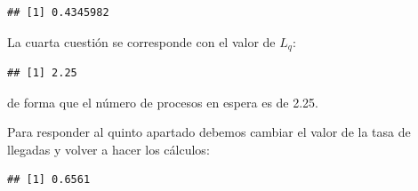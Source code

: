\documentclass[
]{book}
\newenvironment{Shaded}{\begin{snugshade}}{\end{snugshade}}
\newcommand{\AttributeTok}[1]{\textcolor[rgb]{0.77,0.63,0.00}{#1}}
\newcommand{\CommentTok}[1]{\textcolor[rgb]{0.56,0.35,0.01}{\textit{#1}}}
\newcommand{\DecValTok}[1]{\textcolor[rgb]{0.00,0.00,0.81}{#1}}
\newcommand{\FunctionTok}[1]{\textcolor[rgb]{0.00,0.00,0.00}{#1}}
\newcommand{\NormalTok}[1]{#1}
\newcommand{\OtherTok}[1]{\textcolor[rgb]{0.56,0.35,0.01}{#1}}
\newcommand{\SpecialCharTok}[1]{\textcolor[rgb]{0.00,0.00,0.00}{#1}}
\theoremstyle{definition}
\theoremstyle{definition}
\theoremstyle{definition}
\theoremstyle{definition}
\theoremstyle{remark}
\begin{document}
\begin{Shaded}
\end{Shaded}

\begin{verbatim}
## [1] 0.4345982
\end{verbatim}

La cuarta cuestión se corresponde con el valor de \(L_q\):

\begin{Shaded}
\end{Shaded}

\begin{verbatim}
## [1] 2.25
\end{verbatim}

de forma que el número de procesos en espera es de 2.25.

Para responder al quinto apartado debemos cambiar el valor de la tasa de llegadas y volver a hacer los cálculos:

\begin{Shaded}
\end{Shaded}

\begin{verbatim}
## [1] 0.6561
\end{verbatim}

\begin{Shaded}
\end{Shaded}
\end{document}
